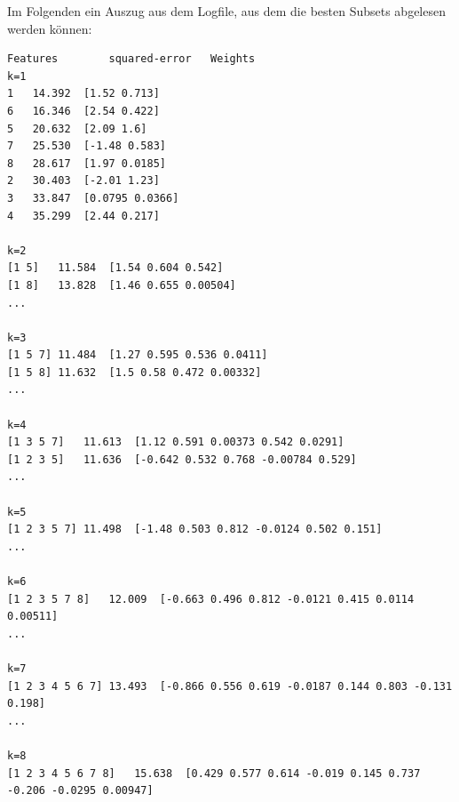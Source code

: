 \documentclass{article}
\begin{document}
	Im Folgenden ein Auszug aus dem Logfile, aus dem die besten Subsets abgelesen werden können:
	\begin{verbatim}
Features		squared-error	Weights
k=1
1	14.392	[1.52 0.713]
6	16.346	[2.54 0.422]
5	20.632	[2.09 1.6]
7	25.530	[-1.48 0.583]
8	28.617	[1.97 0.0185]
2	30.403	[-2.01 1.23]
3	33.847	[0.0795 0.0366]
4	35.299	[2.44 0.217]

k=2
[1 5]	11.584	[1.54 0.604 0.542]
[1 8]	13.828	[1.46 0.655 0.00504]
...

k=3
[1 5 7]	11.484	[1.27 0.595 0.536 0.0411]
[1 5 8]	11.632	[1.5 0.58 0.472 0.00332]
...

k=4
[1 3 5 7]	11.613	[1.12 0.591 0.00373 0.542 0.0291]
[1 2 3 5]	11.636	[-0.642 0.532 0.768 -0.00784 0.529]
...

k=5
[1 2 3 5 7]	11.498	[-1.48 0.503 0.812 -0.0124 0.502 0.151]
...

k=6
[1 2 3 5 7 8]	12.009	[-0.663 0.496 0.812 -0.0121 0.415 0.0114 0.00511]
...

k=7
[1 2 3 4 5 6 7]	13.493	[-0.866 0.556 0.619 -0.0187 0.144 0.803 -0.131 0.198]
...

k=8
[1 2 3 4 5 6 7 8]	15.638	[0.429 0.577 0.614 -0.019 0.145 0.737 -0.206 -0.0295 0.00947]
	\end{verbatim}


	
	
\end{document}
